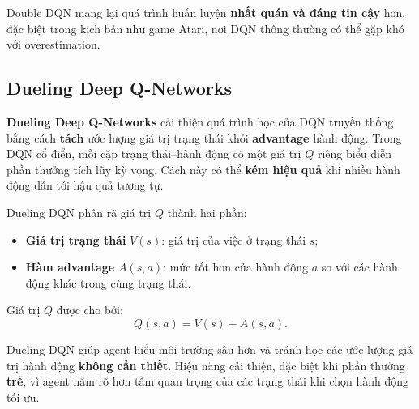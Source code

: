 \begin{tinhchat}[title={Ổn định hơn DQN chuẩn}]
Double DQN mang lại quá trình huấn luyện \textbf{nhất quán và đáng tin cậy} hơn, đặc biệt trong kịch bản như game Atari, nơi DQN thông thường có thể gặp khó với overestimation.
\end{tinhchat}

\subsection{Dueling Deep Q-Networks}

\begin{dinhnghia}[title={Dueling DQN}]
\textbf{Dueling Deep Q-Networks} cải thiện quá trình học của DQN truyền thống bằng cách \textbf{tách} ước lượng giá trị trạng thái khỏi \textbf{advantage} hành động.
Trong DQN cổ điển, mỗi cặp trạng thái--hành động có một giá trị $Q$ riêng biểu diễn phần thưởng tích lũy kỳ vọng.
Cách này có thể \textbf{kém hiệu quả} khi nhiều hành động dẫn tới hậu quả tương tự.
\end{dinhnghia}

\begin{phuongphap}[title={Công thức phân rã $Q$}]
Dueling DQN phân rã giá trị $Q$ thành hai phần:
\begin{itemize}
  \item \textbf{Giá trị trạng thái} $V(s)$: giá trị của việc ở trạng thái $s$;
  \item \textbf{Hàm advantage} $A(s,a)$: mức tốt hơn của hành động $a$ so với các hành động khác trong cùng trạng thái.
\end{itemize}
Giá trị $Q$ được cho bởi:
\[
Q(s,a) = V(s) + A(s,a).
\]
\end{phuongphap}

\begin{tinhchat}[title={Lợi ích học tách rời}]
Dueling DQN giúp agent hiểu môi trường sâu hơn và tránh học các ước lượng giá trị hành động \textbf{không cần thiết}.
Hiệu năng cải thiện, đặc biệt khi phần thưởng \textbf{trễ}, vì agent nắm rõ hơn tầm quan trọng của các trạng thái khi chọn hành động tối ưu.
\end{tinhchat}
